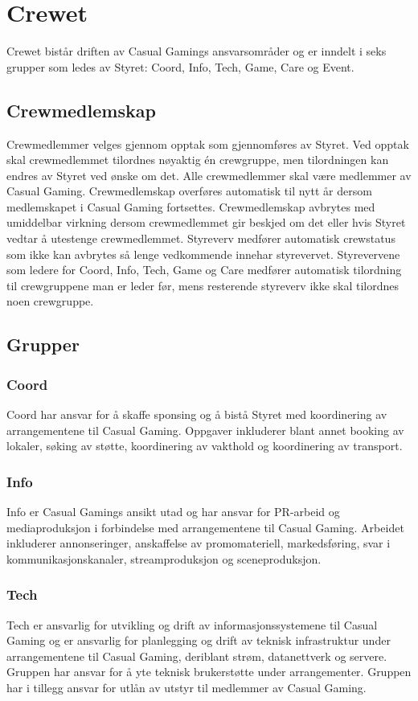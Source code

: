 \chapter{Crewet}
Crewet bistår driften av Casual Gamings ansvarsområder og er inndelt i seks grupper som ledes av Styret: Coord, Info, Tech, Game, Care og Event.

\section{Crewmedlemskap}
Crewmedlemmer velges gjennom opptak som gjennomføres av Styret. Ved opptak skal crewmedlemmet tilordnes nøyaktig én crewgruppe, men tilordningen kan endres av Styret ved ønske om det. Alle crewmedlemmer skal være medlemmer av Casual Gaming. Crewmedlemskap overføres automatisk til nytt år dersom medlemskapet i Casual Gaming fortsettes. Crewmedlemskap avbrytes med umiddelbar virkning dersom crewmedlemmet gir beskjed om det eller hvis Styret vedtar å utestenge crewmedlemmet. Styreverv medfører automatisk crewstatus som ikke kan avbrytes så lenge vedkommende innehar styrevervet. Styrevervene som ledere for Coord, Info, Tech, Game og Care medfører automatisk tilordning til crewgruppene man er leder før, mens resterende styreverv ikke skal tilordnes noen crewgruppe.

\section{Grupper}

\subsection{Coord}
Coord har ansvar for å skaffe sponsing og å bistå Styret med koordinering av arrangementene til Casual Gaming. Oppgaver inkluderer blant annet booking av lokaler, søking av støtte, koordinering av vakthold og koordinering av transport.

\subsection{Info}
Info er Casual Gamings ansikt utad og har ansvar for PR-arbeid og mediaproduksjon i forbindelse med arrangementene til Casual Gaming. Arbeidet inkluderer annonseringer, anskaffelse av promomateriell, markedsføring, svar i kommunikasjonskanaler, streamproduksjon og sceneproduksjon.

\subsection{Tech}
Tech er ansvarlig for utvikling og drift av informasjonssystemene til Casual Gaming og er ansvarlig for planlegging og drift av teknisk infrastruktur under arrangementene til Casual Gaming, deriblant strøm, datanettverk og servere. Gruppen har ansvar for å yte teknisk brukerstøtte under arrangementer. Gruppen har i tillegg ansvar for utlån av utstyr til medlemmer av Casual Gaming.

